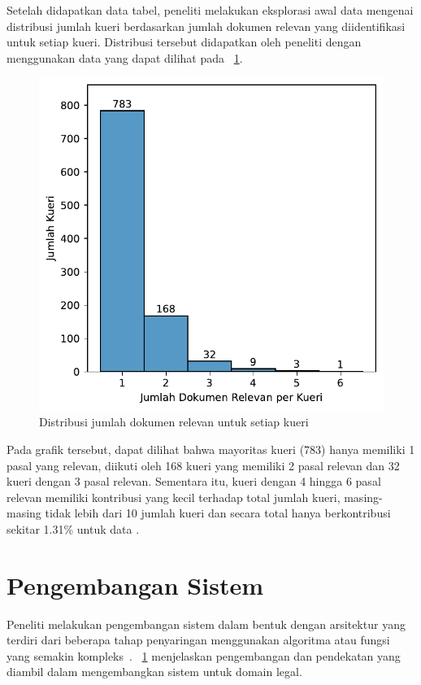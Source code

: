 Setelah didapatkan data tabel, peneliti melakukan eksplorasi awal data mengenai distribusi jumlah kueri berdasarkan jumlah dokumen relevan yang diidentifikasi untuk setiap kueri. Distribusi tersebut didapatkan oleh peneliti dengan menggunakan data \training{} yang dapat dilihat pada \gambar{}~\ref{gambar:distribusi}.
\begin{figure}[!ht]
    \centering
    \includegraphics[scale=0.75]{assets/pdfs/Distribusi Query-Dokumen Relevan.pdf}
    \caption{Distribusi jumlah dokumen relevan untuk setiap kueri}
    \label{gambar:distribusi}
\end{figure}
Pada grafik tersebut, dapat dilihat bahwa mayoritas kueri (783) hanya memiliki 1 pasal yang relevan, diikuti oleh 168 kueri yang memiliki 2 pasal relevan dan 32 kueri dengan 3 pasal relevan. Sementara itu, kueri dengan 4 hingga 6 pasal relevan memiliki kontribusi yang kecil terhadap total jumlah kueri, masing-masing tidak lebih dari 10 jumlah kueri dan secara total hanya berkontribusi sekitar 1.31\% untuk data \training{}.
\section{Pengembangan Sistem \ir{}}
\label{subbab:3:Pengembangan Sistem Information Retrieval}
Peneliti melakukan pengembangan sistem \ir{} dalam bentuk \pipeline{} dengan arsitektur \cascaded{} yang terdiri dari beberapa tahap penyaringan menggunakan algoritma atau fungsi yang semakin kompleks~\citep{wang2011cascade}. \subbab{}~\ref{subbab:3:Pengembangan Sistem Information Retrieval} menjelaskan pengembangan dan pendekatan yang diambil dalam mengembangkan sistem \ir{} untuk domain legal.
